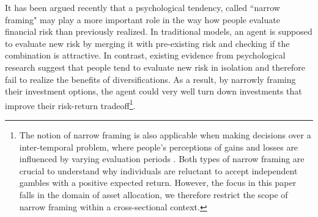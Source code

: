 \documentclass[ukenglish,nottitlepage,thmsb,11pt,letterpaper]{article}
\begin{document}
It has been argued recently that a psychological tendency, called ``narrow framing" may play a more important role in the way how people evaluate financial risk than previously realized. In traditional models, an agent is supposed to evaluate new risk by merging it with pre-existing risk and checking if the combination is attractive. In contrast, existing evidence from psychological research \citep[e.g.,][]{Barberis2006,Anagola2013,Beshears2016} suggest that people tend to evaluate new risk in isolation and therefore fail to realize the benefits of diversifications. As a result, by narrowly framing their investment options, the agent could very well turn down investments that improve their risk-return tradeoff\footnote{The notion of narrow framing is also applicable when making decisions over a inter-temporal problem, where people's perceptions of gains and losses are influenced by varying evaluation periods \citep{Thaler1997,Benartzi1999,Gneezy2003}. Both types of narrow framing are crucial to understand why individuals are reluctant to accept independent gambles with a positive expected return. However, the focus in this paper falls in the domain of asset allocation, we therefore restrict the scope of narrow framing within a cross-sectional context.}.
\end{document}

